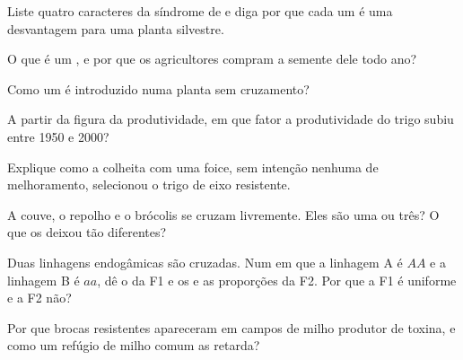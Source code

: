 \begin{exercise}[$\star$]\label{exo:g12:domesticated-plants:2}
Liste quatro caracteres da síndrome de  e diga por que cada
um é uma desvantagem para uma planta silvestre.
\end{exercise}

\begin{exercise}[$\star$]\label{exo:g12:domesticated-plants:3}
O que é um , e por que os agricultores compram a semente dele todo ano?
\end{exercise}

\begin{exercise}[$\star$]\label{exo:g12:domesticated-plants:4}
Como um  é introduzido numa planta sem cruzamento?
\end{exercise}

\begin{exercise}[$\star$]\label{exo:g12:domesticated-plants:5}
A partir da figura da produtividade, em que fator a produtividade do
trigo subiu entre 1950 e 2000?
\end{exercise}

\begin{exercise}[$\star\star$]\label{exo:g12:domesticated-plants:6}
Explique como a colheita com uma foice, sem intenção nenhuma de
melhoramento, selecionou o trigo de eixo resistente.
\end{exercise}

\begin{exercise}[$\star\star$]\label{exo:g12:domesticated-plants:7}
A couve, o repolho e o brócolis se cruzam livremente. Eles são uma
 ou três? O que os deixou tão diferentes?
\end{exercise}

\begin{exercise}[$\star\star$]\label{exo:g12:domesticated-plants:8}
Duas linhagens endogâmicas são cruzadas. Num  em que a linhagem A é
$AA$ e a linhagem B é $aa$, dê o  da F1 e os  e as
proporções da F2. Por que a F1 é uniforme e a F2 não?
\end{exercise}

\begin{exercise}[$\star\star$]\label{exo:g12:domesticated-plants:9}
Por que brocas resistentes apareceram em campos de milho produtor de
toxina, e como um refúgio de milho comum as retarda?
\end{exercise}

